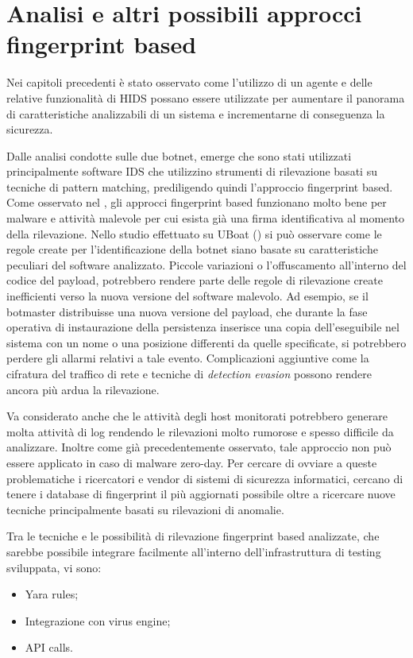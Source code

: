 \chapter{Analisi e altri possibili approcci fingerprint based}

Nei capitoli precedenti è stato osservato  come l'utilizzo di un agente  e delle relative funzionalità di HIDS possano essere utilizzate per  aumentare il panorama di caratteristiche analizzabili di un sistema e incrementarne di conseguenza la sicurezza.

Dalle analisi condotte sulle due botnet, emerge che sono stati utilizzati principalmente software IDS che utilizzino strumenti di rilevazione basati su tecniche di pattern matching, prediligendo quindi l'approccio fingerprint based.
Come osservato nel , gli approcci fingerprint based funzionano molto bene per malware e attività malevole per cui esista già una firma identificativa al momento della rilevazione. Nello studio  effettuato su UBoat () si può osservare come le regole create per l'identificazione della botnet siano basate su caratteristiche peculiari del software analizzato. Piccole variazioni o l'offuscamento all'interno del codice del  payload, potrebbero rendere parte delle regole di rilevazione create inefficienti verso la nuova versione del software malevolo. Ad esempio, se il botmaster distribuisse una nuova versione del payload, che durante la fase operativa di instaurazione della persistenza inserisce una copia dell'eseguibile nel sistema con un nome o una posizione differenti da quelle specificate, si potrebbero perdere gli allarmi relativi a tale evento.
Complicazioni aggiuntive come la cifratura del traffico di rete e tecniche di \textit{detection evasion} possono rendere ancora più ardua la rilevazione.

Va considerato anche che le attività degli host monitorati potrebbero generare molta attività di log rendendo le rilevazioni molto rumorose e spesso difficile da analizzare.
Inoltre come già precedentemente osservato, tale approccio non può essere applicato in caso di malware zero-day. Per cercare di ovviare a queste problematiche i ricercatori e vendor di sistemi di sicurezza informatici, cercano di tenere i database di fingerprint  il più aggiornati possibile oltre a ricercare nuove tecniche principalmente basati su rilevazioni di anomalie.

Tra le tecniche e le possibilità di rilevazione  fingerprint based analizzate, che sarebbe possibile integrare facilmente all'interno dell'infrastruttura di testing sviluppata, vi sono:
\begin{itemize}
    \item Yara rules;
    \item Integrazione con virus engine;
    \item API calls.
\end{itemize}

